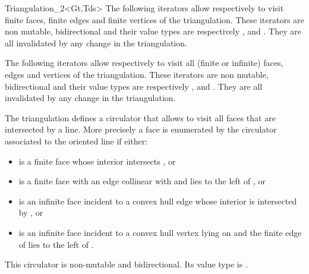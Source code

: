 \begin{ccClassTemplate}{Triangulation_2<Gt,Tds>}
The following iterators allow respectively to visit 
finite faces,  finite edges and  finite vertices
of the triangulation. These iterators are non mutable, bidirectional
and their value types are respectively
,  and . 
They are all invalidated by any change in the triangulation.

\ccGlue
{}

\ccGlue
{}

\ccGlue
{}


The following iterators allow respectively to visit all
(finite or infinite) faces, edges and vertices
of the triangulation. These iterators are non mutable, bidirectional
and their value types are respectively
,  and . 
They are all invalidated by any change in the triangulation.

\ccGlue
{}

\ccGlue
{}

\ccGlue
{}


The triangulation defines a circulator that allows
to visit all faces that are intersected by a line. 
More precisely a face   is enumerated by the circulator 
associated to the oriented line  if either:
\begin{itemize}\ccTexHtml{\itemsep0pt}{}
\item 
{} is a finite face whose interior intersects , or
\item
  is a finite face with  an edge collinear with  and lies
to the left of , or
\item
{} is an infinite face incident to a  convex hull edge 
whose interior is intersected
by , or
\item
{} is an infinite face incident to a  convex hull vertex
lying on   and the finite edge of 
lies to the left of . 
\end{itemize}
This circulator is
non-mutable and bidirectional. Its value type is .


\end{ccClassTemplate}
